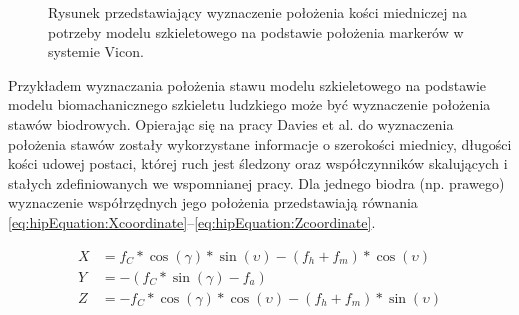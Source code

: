 \begin{figure}
	\centering	
	\caption{Rysunek przedstawiający wyznaczenie położenia kości miedniczej na potrzeby modelu szkieletowego na podstawie położenia markerów w systemie Vicon\cite{ViconModelingInstruction}.}
	\label{fig:literature:vicon:pelvisPlacement}
\end{figure}
		
Przykładem wyznaczania położenia stawu modelu szkieletowego na podstawie modelu biomachanicznego szkieletu ludzkiego może być wyznaczenie położenia stawów biodrowych. Opierając się na pracy Davies et al. \cite{Davis1991} do wyznaczenia położenia stawów zostały wykorzystane informacje o szerokości miednicy, długości kości udowej postaci, której ruch jest śledzony oraz współczynników skalujących i stałych zdefiniowanych we wspomnianej pracy. Dla jednego biodra (np. prawego) wyznaczenie współrzędnych jego położenia przedstawiają równania \eqref{eq:hipEquation:Xcoordinate}--\eqref{eq:hipEquation:Zcoordinate}.
		
\begin{subequations}
	\begin{align}
		X & = f_C * \cos(\gamma) * \sin(\upsilon) - (f_h + f_m) * \cos(\upsilon) \label{eq:hipEquation:Xcoordinate} \\
		Y & = -(f_C * \sin(\gamma) - f_a) \label{eq:hipEquation:Ycoordinate}                                        \\
		Z & = -f_C * \cos(\gamma)*\cos(\upsilon) - (f_h + f_m) * \sin(\upsilon) \label{eq:hipEquation:Zcoordinate}  
	\end{align}
	\label{eq:hipEquation:XYZcoordinates}
\end{subequations}
		
